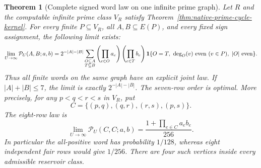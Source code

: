 \documentclass[11pt]{article}
\newtheorem{theorem}{Theorem}[section]
\newcommand{\T}{\mathbf T}
\begin{document}
\begin{theorem}[Complete signed word law on one infinite prime graph]
\label{thm:native-signed-word-law}
Let \(R\) and the computable infinite prime class \(V_R\) satisfy
Theorem~\ref{thm:native-prime-cycle-kernel}.
For every finite \(P\subseteq V_R\), all \(A,B\subseteq E(P)\), and
every fixed sign assignment, the following limit exists:
\begin{equation}\label{eq:native-signed-word-law}
 \lim_{U\to\infty}\mathcal P_U(A,B;a,b)
 =
 2^{-|A|-|B|}
 \sum_{\substack{O\subseteq A\\T\subseteq B}}
 \left(\prod_{e\in O}a_e\right)\left(\prod_{e\in T}b_e\right)
 \mathbf1\{O=T,\ \deg_O(v)\ {\rm even}\ (v\in P),\
                        |O|\ {\rm even}\}.
\end{equation}
Thus all finite words on the same graph have an explicit joint law.
If \(|A|+|B|\leq7\), the limit is exactly
\(2^{-|A|-|B|}\). The seven-row order is optimal.
More precisely, for any \(p<q<r<s\) in \(V_R\), put
\[
 C=\{(p,q),(q,r),(r,s),(p,s)\}.
\]
The eight-row law is
\begin{equation}\label{eq:native-signed-four-cycle-law}
 \lim_{U\to\infty}\mathcal P_U(C,C;a,b)
   =\frac{1+\prod_{e\in C}a_eb_e}{256}.
\end{equation}
In particular the all-positive word has probability \(1/128\), whereas
eight independent fair rows would give \(1/256\).
There are four such vertices inside every admissible reservoir class.
\end{theorem}
\end{document}
